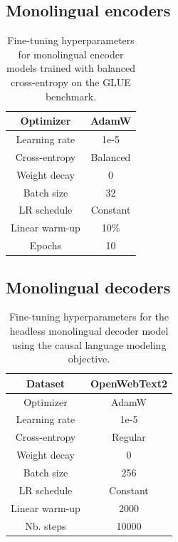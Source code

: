 \begin{appendices}
\subsection{Monolingual encoders}
\label{app:ft_mono_enc}
\begin{table}[H]
\centering \small
\begin{tabular}{c|c}
\toprule
Optimizer        &   AdamW         \\ \hline
Learning rate        &   1e-5         \\ \hline
Cross-entropy  &  Balanced  \\ \hline
Weight decay  &     0      \\ \hline
Batch size & 32 \\ \hline
LR schedule & Constant \\ \hline
Linear warm-up & 10\% \\ \hline
Epochs & 10 \\ \bottomrule
\end{tabular}
\caption{Fine-tuning hyperparameters for monolingual encoder models trained with balanced cross-entropy on the GLUE benchmark.}
\label{tab:ft_mono_enc}
\end{table}

\subsection{Monolingual decoders}
\label{app:ft_mono_dec}
\begin{table}[H]
\centering \small
\begin{tabular}{c|c}
\toprule
Dataset        &   OpenWebText2         \\ \hline
Optimizer        &   AdamW         \\ \hline
Learning rate        &   1e-5         \\ \hline
Cross-entropy  &  Regular    \\ \hline
Weight decay  &     0      \\ \hline
Batch size & 256 \\ \hline
LR schedule & Constant \\ \hline
Linear warm-up & 2000 \\ \hline
Nb. steps & 10000 \\ \bottomrule
\end{tabular}
\caption{Fine-tuning hyperparameters for the headless monolingual decoder model using the causal language modeling objective.}
\label{tab:ft_mono_dec}
\end{table}


\end{appendices}
